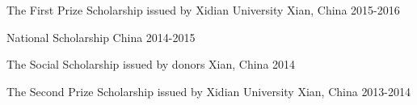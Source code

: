 

\begin{cvhonors}

  \cvhonor
    {The First Prize Scholarship} %
    { issued by Xidian University} %
    {Xian, China } %
    {2015-2016} %

  \cvhonor
    {National Scholarship} %
    {} %
    {China } %
    {2014-2015} %

  \cvhonor
    {The Social Scholarship} %
    {issued by donors} %
   {Xian, China } %
    {2014} %

  \cvhonor
    {The Second Prize Scholarship} %
	{issued by Xidian University}
    {Xian, China } %
    {2013-2014} %
    
\end{cvhonors}




